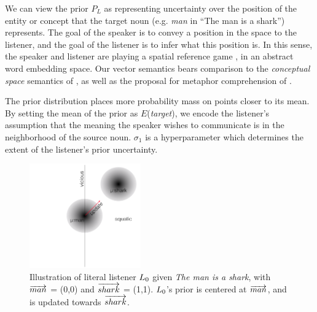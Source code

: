 \documentclass[9pt,twocolumn,twoside,lineno]{pnas-new}
\begin{document}
		We can view the prior $P_L$ as representing uncertainty over the position of the entity or concept that the target noun (e.g. \emph{man} in ``The man is a shark'') represents.
		The goal of the speaker is to convey a position in the space 
		to the listener, and the goal of the listener is to infer what this position is. In this sense, the speaker and listener are playing a spatial reference game  \cite{golland2010game}, in an abstract word embedding space. Our vector semantics bears comparison to the \emph{conceptual space} semantics of \cite{gardenfors2004conceptual}, as well as the proposal for metaphor comprehension of \cite{kintsch2000metaphor}.

		
		

		The prior distribution places more probability mass on points closer to its mean. By setting the mean of the prior as $E$(\emph{target}), we encode the listener's assumption that the meaning the speaker wishes to communicate is in the neighborhood of the source noun. $\sigma_1$ is a hyperparameter which determines the extent of the listener's prior uncertainty.

		\begin{figure}[htbp]
		\centering
		\includegraphics[height=4.5cm]{images/diagram1.png}
		   
		  \caption{Illustration of literal listener $L\protect_0$ given \emph{The man is a shark}, with $\protect\overrightarrow{man}$ = (0,0) and $\protect\overrightarrow{shark}$ = (1,1). $L\protect_0$'s prior is centered at $\protect\overrightarrow{man}$, and is updated towards $\protect\overrightarrow{shark}$.}
		  \label{fig:2d}
		\end{figure}
\end{document}
